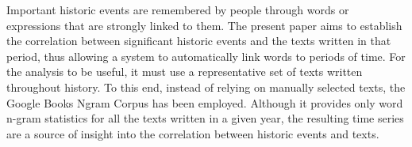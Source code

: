 Important historic events are remembered by people through words or expressions that are strongly linked to them. The present paper aims to establish the correlation between significant historic events and the texts written in that period, thus allowing a system to automatically link words to periods of time. For the analysis to be useful, it must use a representative set of texts written throughout history. To this end, instead of relying on manually selected texts, the Google Books Ngram Corpus has been employed. Although it provides only word n-gram statistics for all the texts written in a given year, the resulting time series are a source of insight into the correlation between historic events and texts.
